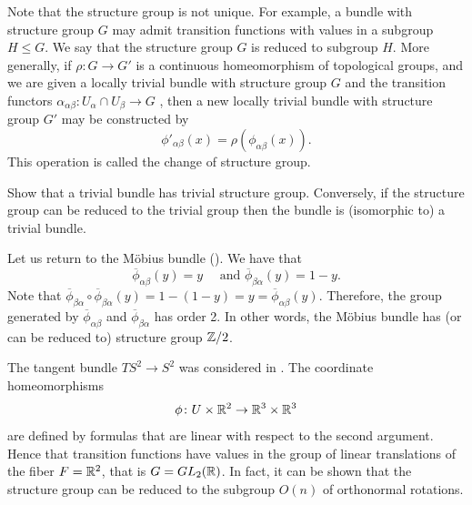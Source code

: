 \documentclass[ma3408.tex]{subfiles}
\begin{document}
\begin{Rem}

\end{Rem}
\begin{Rem}
Note that the structure group is not unique. For example, a bundle with structure group $G$ may admit transition functions with values in a subgroup $H \le G$. We say that the structure group $G$ is reduced to subgroup $H$. More generally, if $\rho \colon G \to G'$ is a continuous homeomorphism of topological groups, and we are given a locally trivial bundle with structure group $G$ and the transition functors $\alpha_{\alpha \beta} \colon U_{\alpha} \cap U_{\beta} \to G$ , then a new locally trivial bundle with structure group $G'$ may be constructed by 
\[
\phi'_{\alpha\beta}(x) = \rho(\phi_{\alpha\beta}(x)).
\]
This operation is called the change of structure group. 
\end{Rem}
\begin{exercise}{}{}
Show that a trivial bundle has trivial structure group. Conversely, if the structure group can be reduced to the trivial group then the bundle is (isomorphic to) a trivial bundle. 
\end{exercise}
\begin{Exa}
Let us return to the M{\"o}bius bundle (). We have that 
\[
\overline \phi_{\alpha\beta}(y) = y \quad \text{ and } \overline \phi_{\beta\alpha}(y) = 1-y.
\]
Note that $\overline \phi_{\beta\alpha} \circ \overline \phi_{\beta\alpha}(y) = 1-(1-y) = y = \overline \phi_{\alpha\beta}(y)$. Therefore, the group generated by $\overline{\phi}_{\alpha\beta}$ and $\overline \phi_{\beta\alpha}$ has order 2. In other words, the M{\"o}bius bundle has (or can be reduced to) structure group $\mathbb{Z}/2$. 
\end{Exa}
\begin{Exa}
The tangent bundle $TS^2 \to S^2$ was considered in . The coordinate homeomorphisms
\[
\phi \colon U \times \mathbb{R}^2 \to \mathbb{R}^3 \times \mathbb{R}^3
\]
are defined by formulas that are linear with respect to the second argument. Hence that transition functions have values in the group of linear translations of the fiber $F = \mathbb{R}^2$, that is $G = GL_2(\mathbb{R})$. In fact, it can be shown that the structure group can be reduced to the subgroup $O(n)$ of orthonormal rotations. 
\end{Exa}
\end{document}

